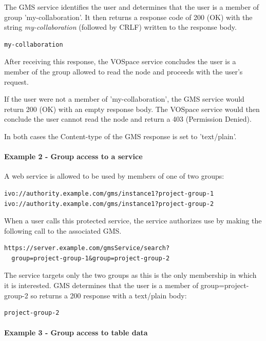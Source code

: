 \documentclass[11pt,a4paper]{ivoa}
\begin{document}
The GMS service identifies the user and determines that the user is a member of group 'my-collaboration'.  It then returns a response code of 200 (OK) with the string \emph{my-collaboration} (followed by CRLF) written to the response body.

\begin{verbatim}
my-collaboration
\end{verbatim}

After receiving this response, the VOSpace service concludes the user is a member of the group allowed to read the node and proceeds with the user's request.

If the user were not a member of 'my-collaboration', the GMS service would return 200 (OK) with an empty response body.  The VOSpace service would then conclude the user cannot read the node and return a 403 (Permission Denied).

In both cases the Content-type of the GMS response is set to 'text/plain'.

\paragraph{Example 2 - Group access to a service}

A web service is allowed to be used by members of one of two groups:

\begin{verbatim}
ivo://authority.example.com/gms/instance1?project-group-1
ivo://authority.example.com/gms/instance1?project-group-2
\end{verbatim}

When a user calls this protected service, the service authorizes use by making the following call to the associated GMS.

\begin{verbatim}
https://server.example.com/gmsService/search?
  group=project-group-1&group=project-group-2
\end{verbatim}

The service targets only the two groups as this is the only membership in which it is interested.  GMS determines that the user is a member of group=project-group-2 so returns a 200 response with a text/plain body:

\begin{verbatim}
project-group-2
\end{verbatim}

\paragraph{Example 3 - Group access to table data}
\end{document}
